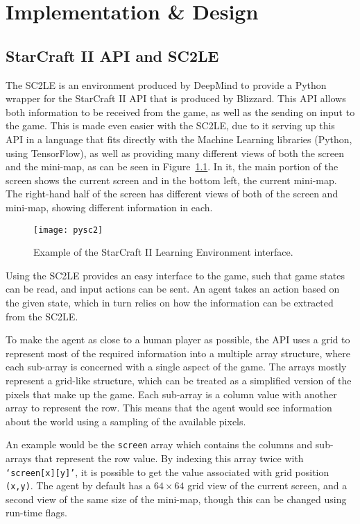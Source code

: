 \chapter{Implementation \& Design}%
\label{implem}

\section{StarCraft II API and SC2LE}

The SC2LE is an environment produced by DeepMind to provide a Python wrapper for
the StarCraft II API that is produced by Blizzard. This API allows both
information to be received from the game, as well as the sending on input to the
game. This is made even easier with the SC2LE, due to it serving up this API in
a language that fits directly with the Machine Learning libraries (Python, using
TensorFlow), as well as providing many different views of both the screen and
the mini-map, as can be seen in Figure~\ref{fig:sc2le}. In it, the main portion
of the screen shows the current screen and in the bottom left, the current
mini-map. The right-hand half of the screen has different views of both of the
screen and mini-map, showing different information in each.

\begin{figure}[h]
    \centering
    \texttt{[image: pysc2]}
    \caption{Example of the StarCraft II Learning Environment interface.}%
    \label{fig:sc2le}
\end{figure}

Using the SC2LE provides an easy interface to the game, such that game states
can be read, and input actions can be sent. An agent takes an action based on
the given state, which in turn relies on how the information can be extracted
from the SC2LE\@.

To make the agent as close to a human player as possible, the API uses a grid to
represent most of the required information into a multiple array structure, where
each sub-array is concerned with a single aspect of the game. The arrays mostly
represent a grid-like structure, which can be treated as a simplified version of
the pixels that make up the game. Each sub-array is a column value with another
array to represent the row. This means that the agent would see information
about the world using a sampling of the available pixels.

An example would be the \texttt{screen} array which contains the columns and
sub-arrays that represent the row value. By indexing this array twice with
\texttt{`screen[x][y]'}, it is possible to get the value associated with grid
position \texttt{(x,y)}. The agent by default has a $64 \times 64$ grid view of
the current screen, and a second view of the same size of the mini-map, though
this can be changed using run-time flags.

